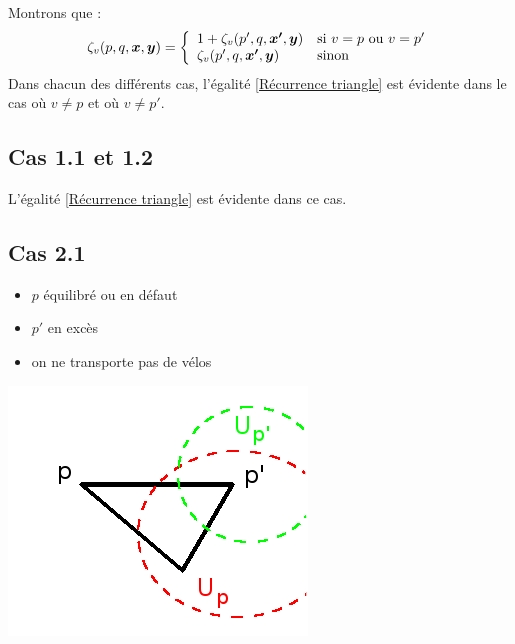 \documentclass[twoside,11pt,openany,a4paper]{rapport}
\begin{document}
Montrons que :
\begin{gather} \label{Récurrence triangle}
  \zeta_v(p,q,\boldsymbol{x},\boldsymbol{y}) = \left\{
  \begin{array}{ll}
    1+\zeta_v(p',q,\boldsymbol{x'},\boldsymbol{y}) & \mbox{si } v=p \mbox{ ou } v=p' \\
    \zeta_v(p',q,\boldsymbol{x'},\boldsymbol{y}) & \mbox{sinon}
  \end{array}
  \right.
\end{gather}
Dans chacun des différents cas, l'égalité \ref{Récurrence triangle} est évidente dans le cas où $v \ne p$ et où $v \ne p'$.

\subsection*{Cas 1.1 et 1.2}

L'égalité \ref{Récurrence triangle} est évidente dans ce cas.

\subsection*{Cas 2.1}

\begin{minipage}{0.5\linewidth}
\begin{itemize}
\item $p$ équilibré ou en défaut
\item $p'$ en excès
\item on ne transporte pas de vélos
\end{itemize}
\end{minipage}
\begin{minipage}{0.5\linewidth}
\begin{center}
\includegraphics[scale=0.5]{graphe_triangulaire_21.jpg}
\end{center}
\end{minipage}
\end{document}
